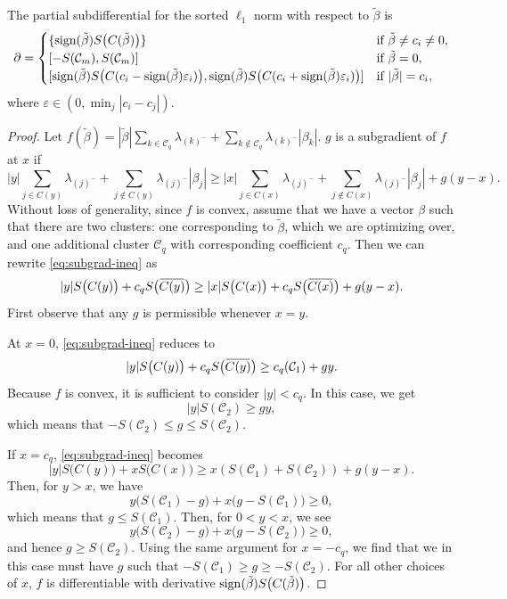 \begin{theorem}
  \label{thm:cluster-subdifferential}
  The partial subdifferential for the sorted \(\ell_1\) norm with respect
  to \(\tilde\beta\) is
  \[
    \partial =
    \begin{cases}
      \{\sign(\tilde\beta) S\big(C(\tilde\beta)\big)\}                    & \text{if } \tilde\beta \neq c_i \neq 0, \\
      [-S(\mathcal{C}_m), S(\mathcal{C}_m)]                               & \text{if } \tilde\beta = 0,             \\
      [\sign(\tilde\beta)S\big( C(c_i - \sign(\tilde\beta)\varepsilon_i)\big), \sign(\tilde\beta)S\big(C(c_i + \sign(\tilde\beta)\varepsilon_i)\big)] & \text{if } |\tilde\beta| = c_i,
    \end{cases}
  \]
  where \(\varepsilon \in (0, \min_{j}|c_i - c_j|)\).
\end{theorem}
\begin{proof}
  Let \(f(\tilde\beta) = |\tilde\beta|\sum_{k \in \mathcal{C}_q}\lambda_{(k)^-} + \sum_{k \notin \mathcal{C}_q} \lambda_{(k)^-}|\beta_k|\).
  \(g\) is a subgradient of \(f\) at \(x\) if
  \begin{equation}
    \label{eq:subgrad-ineq}
    |y|\sum_{j \in C(y)}\lambda_{(j)^-} + \sum_{j \notin C(y)}\lambda_{(j)^-}|\beta_j| 
    \geq |x|\sum_{j \in C(x)} \lambda_{(j)^-} + \sum_{j \notin C(x)}\lambda_{(j)^-}|\beta_j| + g(y - x).
  \end{equation}
  Without loss of generality, since \(f\) is convex, assume that we have
  a vector \(\beta\) such that there are two clusters: one corresponding
  to \(\tilde\beta\), which we are optimizing over, and
  one additional cluster \(\mathcal{C}_q\) with corresponding
  coefficient \(c_q\). Then we can rewrite \eqref{eq:subgrad-ineq} as
  \[
    |y|S\big(C(y)\big) + c_q S\big(\widebar{C(y)}\big) \geq
    |x| S\big(C(x)\big) + c_q S\big(\widebar{C(x)}\big) + g(y - x).
  \]
  First observe that any \(g\) is permissible whenever \(x = y\).

  At \(x = 0\), \eqref{eq:subgrad-ineq} reduces to
  \[
    |y|S\big(C(y)\big) + c_q S\big(\widebar{C(y)}\big)
    \geq c_q(\mathcal{C}_1) + gy.
  \]
  Because \(f\) is convex, it is sufficient to consider \(|y| < c_q\).
  In this case, we get
  \[
    |y|S(\mathcal{C}_2) \geq gy,
  \]
  which means that \(-S(\mathcal{C}_2) \leq g \leq S(\mathcal{C}_2)\).

  If \(x = c_q\), \eqref{eq:subgrad-ineq} becomes
  \[
    |y|S\big(C(y)\big) + x S\big(C(x)\big) \geq x(S(\mathcal{C}_1) + S(\mathcal{C}_2)) + g(y - x).
  \]
  Then, for \(y > x\), we have
  \[
    y\big(S(\mathcal{C}_1) - g\big) + x\big(g - S(\mathcal{C}_1)\big) \geq 0,
  \]
  which means that \(g \leq S(\mathcal{C}_1)\).
  Then, for \(0 < y < x\), we see
  \[
    y\big(S(\mathcal{C}_2) - g\big) + x(g - S(\mathcal{C}_2)\big) \geq 0,
  \]
  and hence \(g \geq S(\mathcal{C}_2)\).
  Using the same argument for \(x = -c_q\), we find that we in this case
  must have \(g\) such that 
  \(-S(\mathcal{C}_1) \geq g \geq - S(\mathcal{C}_2)\).
  For all other choices of \(x\), \(f\) is differentiable with
  derivative \(\operatorname{sign}(\tilde\beta)S\big(C(\tilde\beta)\big)\).
\end{proof}

